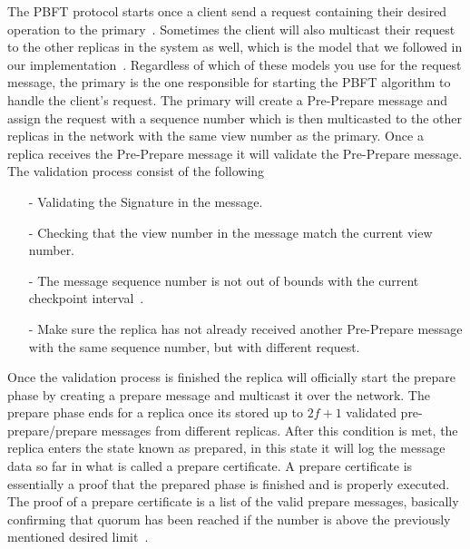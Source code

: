 The PBFT protocol starts once a client send a request containing their desired operation to the primary~\cite[p.~4]{PAPER:OGPBFT}. Sometimes the client will also multicast their request to the other replicas in the system as well, which is the model that we followed in our implementation~\cites[p.~2]{PAPER:DPBFT}[p.~406]{PAPER:PBFTRecovery}[p.~258]{BOOK:BuildDepDistSyst}. Regardless of which of these models you use for the request message, the primary is the one responsible for starting the PBFT algorithm to handle the client's request. The primary will create a Pre-Prepare message and assign the request with a sequence number which is then multicasted to the other replicas in the network with the same view number as the primary. Once a replica receives the Pre-Prepare message it will validate the Pre-Prepare message. The validation process consist of the following~\cites[p.~4]{PAPER:OGPBFT} {SLIDES:PBFT}[p.~259]{BOOK:BuildDepDistSyst}
\begin{itemize}
	\item[-]Validating the Signature in the message.
	\item[-]Checking that the view number in the message match the current view number.
	\item[-]The message sequence number is not out of bounds with the current checkpoint interval~\cites{SLIDES:PBFT}[p.~4]{PAPER:OGPBFT}.
	\item[-]Make sure the replica has not already received another Pre-Prepare message with the same sequence number, but with different request.
\end{itemize} 
Once the validation process is finished the replica will officially start the prepare phase by creating a prepare message and multicast it over the network. The prepare phase ends for a replica once its stored up to $2f+1$ validated pre-prepare/prepare messages from different replicas. After this condition is met, the replica enters the state known as prepared, in this state it will log the message data so far in what is called a prepare certificate. A prepare certificate is essentially a proof that the prepared phase is finished and is properly executed. The proof of a prepare certificate is a list of the valid prepare messages, basically confirming that quorum has been reached if the number is above the previously mentioned desired limit~\cites[p.~408]{PAPER:PBFTRecovery}[p.~457]{BOOK:MVstandver3}. 
